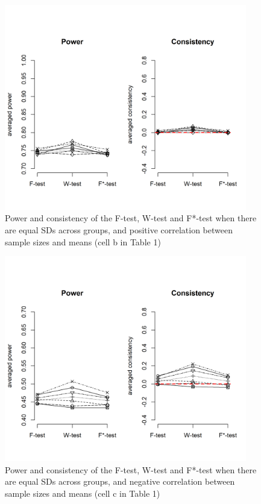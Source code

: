 \documentclass[man,floatsintext]{apa6}
\begin{document}
\begin{figure}
\includegraphics[width=400px]{Rmarkdown folder/Rmarkdown inputs/Fig2b} \caption{Power and consistency of the F-test, W-test and F*-test when there are equal SDs across groups, and positive correlation between sample sizes and means (cell b in Table 1)}\label{fig:unnamed-chunk-7}
\end{figure}

\begin{figure}
\includegraphics[width=400px]{Rmarkdown folder/Rmarkdown inputs/Fig2c} \caption{Power and consistency of the F-test, W-test and F*-test when there are equal SDs across groups, and negative correlation between sample sizes and means (cell c in Table 1)}\label{fig:unnamed-chunk-8}
\end{figure}
\end{document}
